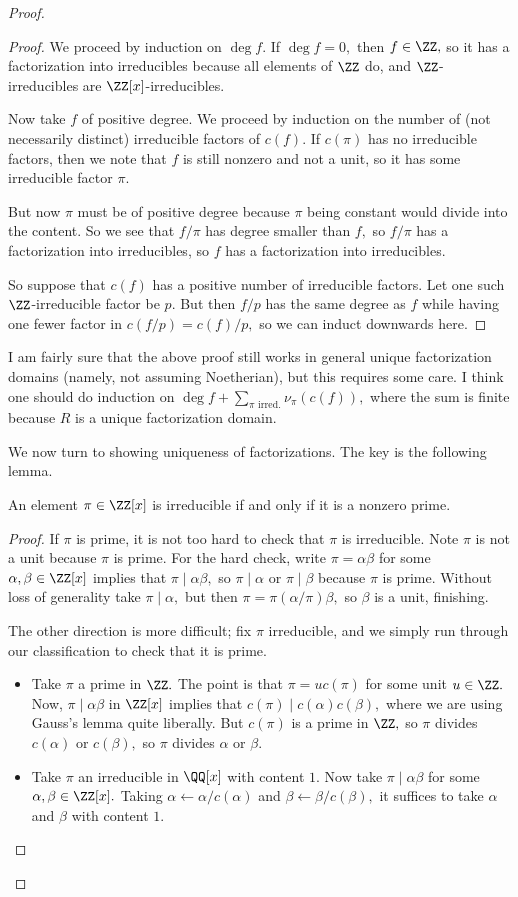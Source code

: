 \begin{proof}
\begin{proof}
		We proceed by induction on $\deg f.$ If $\deg f=0,$ then $f\in\ZZ,$ so it has a factorization into irreducibles because all elements of $\ZZ$ do, and $\ZZ$-irreducibles are $\ZZ[x]$-irreducibles.

		Now take $f$ of positive degree. We proceed by induction on the number of (not necessarily distinct) irreducible factors of $c(f).$	
		If $c(\pi)$ has no irreducible factors, then we note that $f$ is still nonzero and not a unit, so it has some irreducible factor $\pi.$
		
		But now $\pi$ must be of positive degree because $\pi$ being constant would divide into the content. So we see that $f/\pi$ has degree smaller than $f,$ so $f/\pi$ has a factorization into irreducibles, so $f$ has a factorization into irreducibles.

		So suppose that $c(f)$ has a positive number of irreducible factors. Let one such $\ZZ$-irreducible factor be $p.$ But then $f/p$ has the same degree as $f$ while having one fewer factor in $c(f/p)=c(f)/p,$ so we can induct downwards here.
	\end{proof}
	\begin{remark}[Nir]
		I am fairly sure that the above proof still works in general unique factorization domains (namely, not assuming Noetherian), but this requires some care. I think one should do induction on $\deg f+\sum_{\pi\text{ irred.}}\nu_\pi(c(f)),$ where the sum is finite because $R$ is a unique factorization domain.
	\end{remark}
	We now turn to showing uniqueness of factorizations. The key is the following lemma.
	\begin{lemma}
		An element $\pi\in\ZZ[x]$ is irreducible if and only if it is a nonzero prime.
	\end{lemma}
	\begin{proof}
		If $\pi$ is prime, it is not too hard to check that $\pi$ is irreducible. Note $\pi$ is not a unit because $\pi$ is prime. For the hard check, write $\pi=\alpha\beta$ for some $\alpha,\beta\in\ZZ[x]$ implies that $\pi\mid\alpha\beta,$ so $\pi\mid\alpha$ or $\pi\mid\beta$ because $\pi$ is prime. Without loss of generality take $\pi\mid\alpha,$ but then $\pi=\pi(\alpha/\pi)\beta,$ so $\beta$ is a unit, finishing.

		The other direction is more difficult; fix $\pi$ irreducible, and we simply run through our classification to check that it is prime.
		\begin{itemize}
			\item Take $\pi$ a prime in $\ZZ.$ The point is that $\pi=uc(\pi)$ for some unit $u\in\ZZ.$ Now, $\pi\mid\alpha\beta$ in $\ZZ[x]$ implies that $c(\pi)\mid c(\alpha)c(\beta),$ where we are using Gauss's lemma quite liberally. But $c(\pi)$ is a prime in $\ZZ,$ so $\pi$ divides $c(\alpha)$ or $c(\beta),$ so $\pi$ divides $\alpha$ or $\beta.$
			\item Take $\pi$ an irreducible in $\QQ[x]$ with content $1.$ Now take $\pi\mid\alpha\beta$ for some $\alpha,\beta\in\ZZ[x].$ Taking $\alpha\leftarrow\alpha/c(\alpha)$ and $\beta\leftarrow\beta/c(\beta),$ it suffices to take $\alpha$ and $\beta$ with content $1.$
			

\end{itemize}
\end{proof}
\end{proof}
